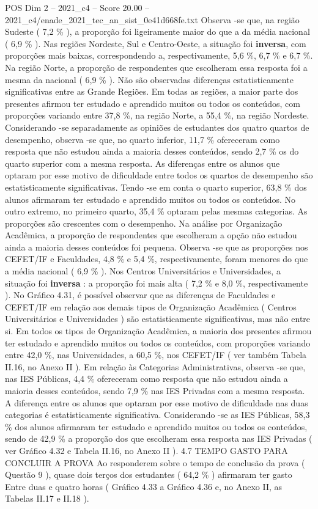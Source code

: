 \begin{textsample}{POS Dim 2 – 2021\_c4 – Score 20.00 – 2021\_c4/enade\_2021\_tec\_an\_sist\_0e41d668fe.txt}
Observa -se que, na região Sudeste ( 7,2 \% ), a proporção foi ligeiramente maior do que a da média nacional ( 6,9 \% ).
Nas regiões Nordeste, Sul e Centro-Oeste, a situação foi \textbf{inversa}, com proporções mais baixas, correspondendo a, respectivamente, 5,6 \%, 6,7 \% e 6,7 \%.
Na região Norte, a proporção de respondentes que escolheram essa resposta foi a mesma da nacional ( 6,9 \% ).
Não são observadas diferenças estatisticamente significativas entre as Grande Regiões.
Em todas as regiões, a maior parte dos presentes afirmou ter estudado e aprendido muitos ou todos os conteúdos, com proporções variando entre 37,8 \%, na região Norte, a 55,4 \%, na região Nordeste.
Considerando -se separadamente as opiniões de estudantes dos quatro quartos de desempenho, observa -se que, no quarto inferior, 11,7 \% ofereceram como resposta que não estudou ainda a maioria desses conteúdos, sendo 2,7 \% os do quarto superior com a mesma resposta.
As diferenças entre os alunos que optaram por esse motivo de dificuldade entre todos os quartos de desempenho são estatisticamente significativas.
Tendo -se em conta o quarto superior, 63,8 \% dos alunos afirmaram ter estudado e aprendido muitos ou todos os conteúdos.
No outro extremo, no primeiro quarto, 35,4 \% optaram pelas mesmas categorias.
As proporções são crescentes com o desempenho.
Na análise por Organização Acadêmica, a proporção de respondentes que escolheram a opção não estudou ainda a maioria desses conteúdos foi pequena.
Observa -se que as proporções nos CEFET/IF e Faculdades, 4,8 \% e 5,4 \%, respectivamente, foram menores do que a média nacional ( 6,9 \% ).
Nos Centros Universitários e Universidades, a situação foi \textbf{inversa} : a proporção foi mais alta ( 7,2 \% e 8,0 \%, respectivamente ).
No Gráfico 4.31, é possível observar que as diferenças de Faculdades e CEFET/IF em relação aos demais tipos de Organização Acadêmica ( Centros Universitários e Universidades ) são estatisticamente significativas, mas não entre si.
Em todos os tipos de Organização Acadêmica, a maioria dos presentes afirmou ter estudado e aprendido muitos ou todos os conteúdos, com proporções variando entre 42,0 \%, nas Universidades, a 60,5 \%, nos CEFET/IF ( ver também Tabela II.16, no Anexo II ).
Em relação às Categorias Administrativas, observa -se que, nas IES Públicas, 4,4 \% ofereceram como resposta que não estudou ainda a maioria desses conteúdos, sendo 7,9 \% nas IES Privadas com a mesma resposta.
A diferença entre os alunos que optaram por esse motivo de dificuldade nas duas categorias é estatisticamente significativa.
Considerando -se as IES Públicas, 58,3 \% dos alunos afirmaram ter estudado e aprendido muitos ou todos os conteúdos, sendo de 42,9 \% a proporção dos que escolheram essa resposta nas IES Privadas ( ver Gráfico 4.32 e Tabela II.16, no Anexo II ). 4.7 TEMPO GASTO PARA CONCLUIR A PROVA Ao responderem sobre o tempo de conclusão da prova ( Questão 9 ), quase dois terços dos estudantes ( 64,2 \% ) afirmaram ter gasto Entre duas e quatro horas ( Gráfico 4.33 a Gráfico 4.36 e, no Anexo II, as Tabelas II.17 e II.18 ).

\end{textsample}
